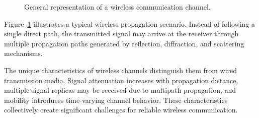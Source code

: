 \begin{figure}[H]
    \centering


    \caption{General representation of a wireless communication channel.}
    \label{fig:wireless_channel_model}
\end{figure}

Figure~\ref{fig:wireless_channel_model} illustrates a typical wireless propagation scenario. Instead of following a single direct path, the transmitted signal may arrive at the receiver through multiple propagation paths generated by reflection, diffraction, and scattering mechanisms.

The unique characteristics of wireless channels distinguish them from wired transmission media. Signal attenuation increases with propagation distance, multiple signal replicas may be received due to multipath propagation, and mobility introduces time-varying channel behavior. These characteristics collectively create significant challenges for reliable wireless communication.

